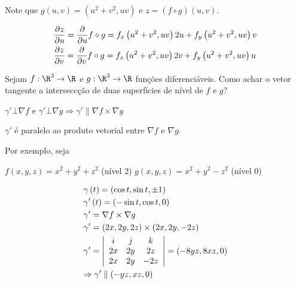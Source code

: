 \documentclass{book}
\begin{document}
\begin{sol}
    Note que $g\left( {u,v} \right) = \left( {u^2  + v^2 ,uv} \right)$ e $z = \left( {f \circ g} \right)\left( {u,v} \right)$.

\[
\begin{gathered}
\frac{{\partial z}}
{{\partial u}} = \frac{\partial }
{{\partial u}}f \circ g = f_x \left( {u^2  + v^2 ,uv} \right)2u + f_y \left( {u^2  + v^2 ,uv} \right)v \hfill \\
\frac{{\partial z}}
{{\partial v}} = \frac{\partial }
{{\partial v}}f \circ g = f_x \left( {u^2  + v^2 ,uv} \right)2v + f_y \left( {u^2  + v^2 ,uv} \right)u \hfill \\
\end{gathered}
\]

\end{sol}

\begin{ex}
    Sejam $f:\R^3  \to \R$ e $g:\R^3  \to \R$ fun\c c\~oes diferenci\'aveis. Como achar o vetor tangente a intersecc\c c\~ao de duas superf\'icies de n\'ivel de $f$ e $g$?
\end{ex}

\begin{sol}

    $\gamma ' \bot \nabla f$ e $\gamma ' \bot \nabla g \Rightarrow \gamma '\parallel \nabla f \times \nabla g$

$\gamma '$ \'e paralelo ao produto vetorial entre $\nabla f$ e $\nabla g$.

Por exemplo, seja

$f\left( {x,y,z} \right) = x^2  + y^2  + z^2$ (n\'ivel 2)
$g\left( {x,y,z} \right) = x^2  + y^2  - z^2$ (n\'ivel 0)


\[
\begin{gathered}
\gamma \left( t \right) = \left( {\cos t,\sin t, \pm 1} \right) \hfill \\
\gamma '\left( t \right) = \left( { - \sin t,\cos t,0} \right) \hfill \\
\gamma ' = \nabla f \times \nabla g \hfill \\
  \gamma ' = \left( {2x,2y,2z} \right) \times \left( {2x,2y, - 2z} \right) \hfill \\
\gamma ' = \left| {\begin{array}{*{20}c}
i & j & k  \\
{2x} & {2y} & {2z}  \\
{2x} & {2y} & { - 2z}  \\

\end{array} } \right| = \left( { - 8yz,8xz,0} \right) \hfill \\
\Rightarrow \gamma '\parallel \left( { - yz,xz,0} \right) \hfill \\
\end{gathered}
\]

\end{sol}
\end{document}
